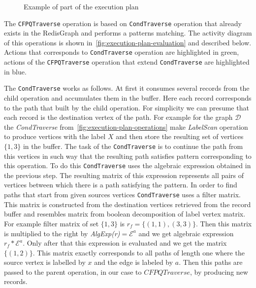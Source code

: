 \begin{figure}[h]
    \centering        
    \caption{Example of part of the execution plan}
    \label{fig:execution-plan-operations}
\end{figure}

The \lstinline{CFPQTraverse} operation is based on \lstinline{CondTraverse} operation that already exists in the RedisGraph and performs a patterns matching. The activity diagram of this operations is shown in~\autoref{fig:execution-plan-evaluation} and described below. Actions that corresponds to \lstinline{CondTraverse} operation are highlighted in green, actions of the \lstinline{CFPQTraverse} operation that extend \lstinline{CondTraverse} are highlighted in blue.

The \lstinline{CondTraverse} works as follows. At first it consumes several records from the child operation and accumulates them in the buffer. Here each record corresponds to the path that built by the child operation. For simplicity we can presume that each record is the destination vertex of the path. For example for the graph $\mathcal{D}$ the \textit{CondTraverse} from~\autoref{fig:execution-plan-operations} make \textit{LabelScan} operation to produce vertices with the label $X$ and then store the resulting set of vertices $\{1, 3\}$ in the buffer. The task of the \lstinline{CondTraverse} is to continue the path from this vertices in such way that the resulting path satisfies pattern corresponding to this operation. To do this \lstinline{CondTraverse} uses the algebraic expression obtained in the previous step. The resulting matrix of this expression represents all pairs of vertices between which there is a path satisfying the pattern. In order to find paths that start from given sources vertices \lstinline{CondTraverse} uses a filter matrix. This matrix is constructed from the destination vertices retrieved from the record buffer and resembles matrix from boolean decomposition of label vertex matrix. For example filter matrix of set $\{1, 3\}$ is $ r_{f}=\{(1, 1), (3, 3)\}$. Then this matrix is multiplied to the right by \textit{AlgExp(r)}$= \mathcal{E}^a$ and we get algebraic expression $r_{f} * \mathcal{E}^a$. Only after that this expression is evaluated and we get the matrix $\{(1, 2)\}$. This matrix exactly corresponds to all paths of length one where the source vertex is labelled by $x$ and the edge is labeled by $a$. Then this paths are passed to the parent operation, in our case to $CFPQTraverse$, by producing new records.

